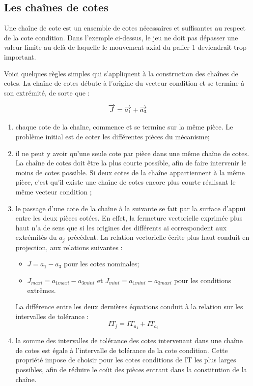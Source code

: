 \documentclass[11pt,oneside]{article}
\begin{document}
\subsection{Les chaînes de cotes}

Une chaîne de cote est un ensemble de cotes nécessaires et suffisantes au respect de la cote condition. Dans l'exemple ci-dessus, le jeu ne doit pas dépasser une valeur limite au delà de laquelle le mouvement axial du palier 1 deviendrait trop important. 

\begin{resultat}
Voici quelques règles simples qui s'appliquent à la construction des chaînes de cotes. La chaîne de cotes débute à l'origine du vecteur condition et se termine à son extrémité, de sorte que :

$$\overrightarrow{J}=\overrightarrow{a_1}+\overrightarrow{a_3}$$

\begin{enumerate}
\item chaque cote de la chaîne, commence et se termine sur la même pièce. Le problème initial est de coter les différentes pièces du mécanisme;
\item il ne peut y avoir qu'une seule cote par pièce dans une même chaîne de cotes. La chaîne de cotes doit être la plus courte possible, afin de faire intervenir le moins de cotes possible. Si deux cotes de la chaîne appartiennent à la même pièce, c'est qu'il existe une chaîne de cotes encore plus courte réalisant le même vecteur condition ;
\item le passage d'une cote de la chaîne à la suivante se fait par la surface d'appui entre les deux pièces cotées. En effet, la fermeture vectorielle exprimée plus haut n'a de sens que si les origines des différents ai correspondent aux extrémités du $a_j$ précédent. La relation vectorielle écrite plus haut conduit en projection, aux relations suivantes :
\begin{itemize}
\item $J=a_1-a_3$ pour les cotes nominales;
\item $J_{maxi}=a_{1 maxi}-a_{3 mini}$ et $J_{mini}=a_{1 mini}-a_{3 maxi}$ pour les conditions extrêmes.
\end{itemize}
La différence entre les deux dernières équations conduit à la relation sur les intervalles de tolérance :
$$
IT_j = IT_{a_1}+IT_{a_3} 
$$
\item la somme des intervalles de tolérance des cotes intervenant dans une chaîne de cotes est égale à l'intervalle de tolérance de la cote condition. Cette propriété impose de choisir pour les cotes conditions de IT les plus larges possibles, afin de réduire le coût des pièces entrant dans la constitution de la chaîne.
\end{enumerate}
\end{resultat}
\end{document}
